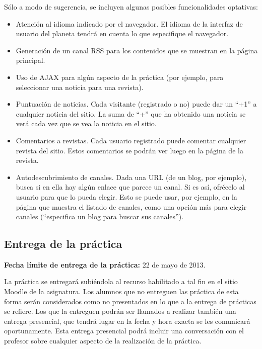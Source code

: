 Sólo a modo de sugerencia, se incluyen algunas posibles funcionalidades optativas:

\begin{itemize}
\item Atención al idioma indicado por el navegador. El idioma de la interfaz de usuario del planeta tendrá en cuenta lo que especifique el navegador.

\item Generación de un canal RSS para los contenidos que se muestran en la página principal.

\item Uso de AJAX para algún aspecto de la práctica (por ejemplo, para seleccionar una noticia para una revista).

\item Puntuación de noticias. Cada visitante (registrado o no) puede dar un ``+1'' a cualquier noticia del sitio. La suma de ``+'' que ha obtenido una noticia se verá cada vez que se vea la noticia en el sitio.

\item Comentarios a revistas. Cada usuario registrado puede comentar cualquier revista del sitio. Estos comentarios se podrán ver luego en la página de la revista.

\item Autodescubrimiento de canales. Dada una URL (de un blog, por ejemplo), busca si en ella hay algún enlace que parece un canal. Si es así, ofrécelo al usuario para que lo pueda elegir. Esto se puede usar, por ejemplo, en la página que muestra el listado de canales, como una opción más para elegir canales (``especifica un blog para buscar sus canales'').
\end{itemize}


\subsection{Entrega de la práctica}

\textbf{Fecha límite de entrega de la práctica:} 22 de mayo de 2013.

La práctica se entregará subiéndola al recurso habilitado a tal fin en el sitio Moodle de la asignatura. Los alumnos que no entreguen las práctica de esta forma serán considerados como no presentados en lo que a la entrega de prácticas se refiere. Los que la entreguen podrán ser llamados a realizar también una entrega presencial, que tendrá lugar en la fecha y hora exacta se les comunicará oportunamente. Esta entrega presencial podrá incluir una conversación con el profesor sobre cualquier aspecto de la realización de la práctica.

